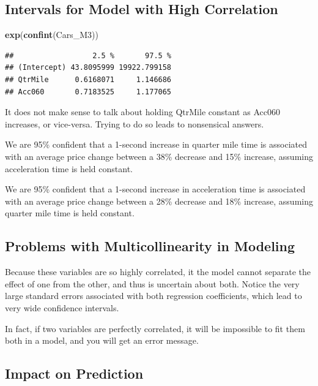 \documentclass[]{book}
\newenvironment{Shaded}{\begin{snugshade}}{\end{snugshade}}
\newcommand{\KeywordTok}[1]{\textcolor[rgb]{0.13,0.29,0.53}{\textbf{#1}}}
\newcommand{\NormalTok}[1]{#1}
\begin{document}
\subsection{Intervals for Model with High
Correlation}\label{intervals-for-model-with-high-correlation}

\begin{Shaded}
\begin{Highlighting}[]
\KeywordTok{exp}\NormalTok{(}\KeywordTok{confint}\NormalTok{(Cars_M3))}
\end{Highlighting}
\end{Shaded}

\begin{verbatim}
##                  2.5 %       97.5 %
## (Intercept) 43.8095999 19922.799158
## QtrMile      0.6168071     1.146686
## Acc060       0.7183525     1.177065
\end{verbatim}

It does not make sense to talk about holding QtrMile constant as Acc060
increases, or vice-versa. Trying to do so leads to nonsensical answers.

We are 95\% confident that a 1-second increase in quarter mile time is
associated with an average price change between a 38\% decrease and 15\%
increase, assuming acceleration time is held constant.

We are 95\% confident that a 1-second increase in acceleration time is
associated with an average price change between a 28\% decrease and 18\%
increase, assuming quarter mile time is held constant.

\subsection{Problems with Multicollinearity in
Modeling}\label{problems-with-multicollinearity-in-modeling}

Because these variables are so highly correlated, it the model cannot
separate the effect of one from the other, and thus is uncertain about
both. Notice the very large standard errors associated with both
regression coefficients, which lead to very wide confidence intervals.

In fact, if two variables are perfectly correlated, it will be
impossible to fit them both in a model, and you will get an error
message.

\subsection{Impact on Prediction}\label{impact-on-prediction}
\end{document}
